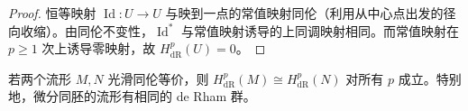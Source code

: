 \documentclass[../../main.tex]{subfiles}
\begin{document}
\begin{proof}
恒等映射 $\operatorname{Id}:U\to U$ 与映到一点的常值映射同伦（利用从中心点出发的径向收缩）。由同伦不变性，$\operatorname{Id}^*$ 与常值映射诱导的上同调映射相同。而常值映射在 $p\geqslant1$ 次上诱导零映射，故 $H^p_{\mathrm{dR}}(U)=0$。
\end{proof}

\begin{corollary}
若两个流形 $M,N$ 光滑同伦等价，则 $H^p_{\mathrm{dR}}(M)\cong H^p_{\mathrm{dR}}(N)$ 对所有 $p$ 成立。特别地，微分同胚的流形有相同的 de Rham 群。
\end{corollary}
\end{document}

